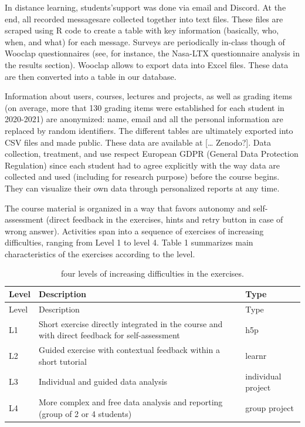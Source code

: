 \documentclass[
]{article}
\begin{document}
In distance learning, students'support was done via email and Discord.
At the end, all recorded messagesare collected together into text files.
These files are scraped using R code to create a table with key
information (basically, who, when, and what) for each message. Surveys
are periodically in-class though of Wooclap questionnaires (see, for
instance, the Nasa-LTX questionnaire analysis in the results section).
Wooclap allows to export data into Excel files. These data are then
converted into a table in our database.

Information about users, courses, lectures and projects, as well as
grading items (on average, more that 130 grading items were established
for each student in 2020-2021) are anonymized: name, email and all the
personal information are replaced by random identifiers. The different
tables are ultimately exported into CSV files and made public. These
data are available at {[}\ldots{} Zenodo?{]}. Data collection,
treatment, and use respect European GDPR (General Data Protection
Regulation) since each student had to agree explicitly with the way data
are collected and used (including for research purpose) before the
course begins. They can visualize their own data through personalized
reports at any time.

The course material is organized in a way that favors autonomy and
self-assessment (direct feedback in the exercises, hints and retry
button in case of wrong answer). Activities span into a sequence of
exercises of increasing difficulties, ranging from Level 1 to level 4.
Table 1 summarizes main characteristics of the exercises according to
the level.

\begin{longtable}[]{@{}
  >{\raggedright\arraybackslash}p{}
  >{\raggedright\arraybackslash}p{}
  >{\raggedright\arraybackslash}p{}@{}}
\caption{four levels of increasing difficulties in the
exercises.}\tabularnewline
\toprule
Level & Description & Type \\
\midrule
\endfirsthead
\toprule
Level & Description & Type \\
\midrule
\endhead
L1 & Short exercise directly integrated in the course and with direct
feedback for self-assessment & h5p \\
L2 & Guided exercise with contextual feedback within a short tutorial &
learnr \\
L3 & Individual and guided data analysis & individual project \\
L4 & More complex and free data analysis and reporting (group of 2 or 4
students) & group project \\
\bottomrule
\end{longtable}
\end{document}
